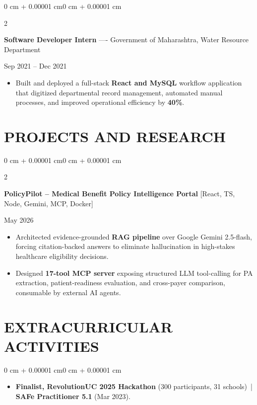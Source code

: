 \documentclass[10pt, letterpaper]{article}
\newenvironment{highlights}{
    \begin{itemize}[
        topsep=0.10 cm,
        parsep=0.06 cm,
        partopsep=0pt,
        itemsep=0.06 cm,
        leftmargin=12pt
    ]
}{
    \end{itemize}
}
\newenvironment{onecolentry}{
    \begin{adjustwidth}{0 cm + 0.00001 cm}{0 cm + 0.00001 cm}
}{
    \end{adjustwidth}
}
\newenvironment{twocolentry}[2][]{
    \onecolentry
    \def\secondColumn{#2}
    \setcolumnwidth{\fill, 4.5 cm}
    \begin{paracol}{2}
}{
    \switchcolumn \raggedleft \secondColumn
    \end{paracol}
    \endonecolentry
}
\begin{document}
\vspace{0.15 cm}

\begin{twocolentry}{Sep 2021 -- Dec 2021}
\textbf{Software Developer Intern} ---- Government of Maharashtra, Water Resource Department
\end{twocolentry}
\begin{highlights}
  \item Built and deployed a full-stack \textbf{React and MySQL} workflow application that digitized departmental record management, automated manual processes, and improved operational efficiency by \textbf{40\%}.
\end{highlights}

\section{PROJECTS AND RESEARCH}
\begin{twocolentry}{May 2026}
\textbf{PolicyPilot -- Medical Benefit Policy Intelligence Portal} [React, TS, Node, Gemini, MCP, Docker]
\end{twocolentry}
\begin{highlights}
  \item Architected evidence-grounded \textbf{RAG pipeline} over Google Gemini 2.5-flash, forcing citation-backed answers to eliminate hallucination in high-stakes healthcare eligibility decisions.
  \item Designed \textbf{17-tool MCP server} exposing structured LLM tool-calling for PA extraction, patient-readiness evaluation, and cross-payer comparison, consumable by external AI agents.
\end{highlights}

\section{EXTRACURRICULAR ACTIVITIES}
\begin{onecolentry}
\begin{highlights}
  \item \textbf{Finalist, RevolutionUC 2025 Hackathon} (300 participants, 31 schools) \,|\, \textbf{SAFe Practitioner 5.1} (Mar 2023).
\end{highlights}
\end{onecolentry}
\end{document}
